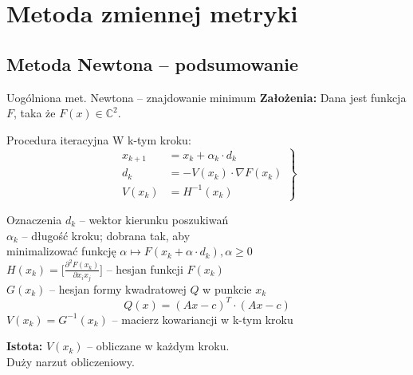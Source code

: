 \section{Metoda zmiennej metryki}

\subsection{Metoda Newtona -- podsumowanie}
  \begin{frame}
    \begin{block}{Uogólniona met. Newtona -- znajdowanie minimum}
      \textbf{Założenia: } Dana jest funkcja $F$, taka że $F(x) \in \mathbb{C}^2$.
    \end{block}
    \begin{block}{Procedura iteracyjna}
      W k-tym kroku:
      \begin{equation}
        \left.
          \begin{aligned}
            x_{k + 1} &= x_{k} + \alpha_{k} \cdot d_{k}\\
            d_{k}     &= - V(x_k) \cdot \nabla F(x_{k})\\
            V(x_k)    &= H^{-1}(x_{k})
          \end{aligned}
       \right\}
      \end{equation}
    \end{block}
  \end{frame}

  \begin{frame}{}
    \begin{block}{Oznaczenia}
      $d_{k}$ -- wektor kierunku poszukiwań\\
      $\alpha_{k}$ -- długość kroku; dobrana tak, aby\\
      \hspace*{8mm} minimalizować funkcję $\alpha \mapsto F(x_{k} + \alpha \cdot d_{k}), \alpha \geq 0$\\
      $H(x_k) = \bigg[ \frac{\partial^2 F(x_{k})}{\partial x_{i} x_{j}} \bigg]$ -- hesjan funkcji $F(x_{k})$\\
      $G(x_k)$ -- hesjan formy kwadratowej $Q$ w punkcie $x_k$\\
      \begin{equation*}
        Q(x) = (Ax - c)^T \cdot (Ax - c)
      \end{equation*}
      $V(x_k) = G^{-1}(x_k)$ -- macierz kowariancji w k-tym kroku
    \end{block}

    \begin{block}{}
      \textbf{Istota: } $V(x_{k})$ -- obliczane w każdym kroku.\\
      Duży narzut obliczeniowy.
    \end{block}
  \end{frame}

